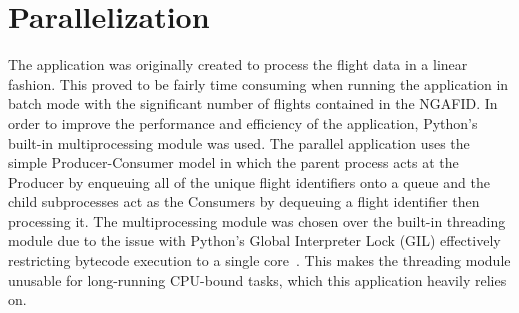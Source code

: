 \section{Parallelization}

	The application was originally created to process the flight data in a linear fashion.  This proved to be fairly time consuming when running the application in batch mode with the significant number of flights contained in the NGAFID.  In order to improve the performance and efficiency of the application, Python's built-in multiprocessing module was used.  The parallel application uses the simple Producer-Consumer model in which the parent process acts at the Producer by enqueuing all of the unique flight identifiers onto a queue and the child subprocesses act as the Consumers by dequeuing a flight identifier then processing it.  The multiprocessing module was chosen over the built-in threading module due to the issue with Python's Global Interpreter Lock (GIL) effectively restricting bytecode execution to a single core~\cite{Beazley:2010:Understanding-t}.  This makes the threading module unusable for long-running CPU-bound tasks, which this application heavily relies on.